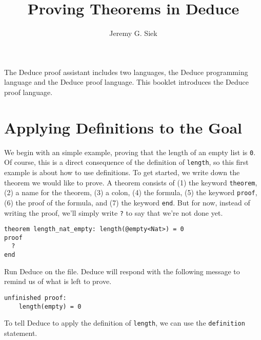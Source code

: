 \documentclass[12pt]{article}
\title{Proving Theorems in Deduce}
\author{Jeremy G. Siek}
\newif\ifBorder
\begin{document}

\Bordertrue

\maketitle

{\footnotesize
\tableofcontents
}
\pagebreak



The Deduce proof assistant includes two languages, the Deduce
programming language and the Deduce proof language. This booklet
introduces the Deduce proof language.

\section{Applying Definitions to the Goal}

We begin with an simple example, proving that the length of an empty
list is \texttt{0}. Of course, this is a direct consequence of the
definition of \texttt{length}, so this first example is about how to
use definitions.  To get started, we write down the theorem we would
like to prove.  A theorem consists of (1) the keyword
\texttt{theorem}, (2) a name for the theorem, (3) a colon, (4) the
formula, (5) the keyword \texttt{proof}, (6) the proof of the formula,
and (7) the keyword \texttt{end}. But for now, instead of writing the
proof, we'll simply write \texttt{?} to say that we're not done yet.

\begin{verbatim}
theorem length_nat_empty: length(@empty<Nat>) = 0
proof
  ?
end
\end{verbatim}

\noindent Run Deduce on the file. Deduce will respond with the following message
to remind us of what is left to prove.

\begin{verbatim}
unfinished proof:
    length(empty) = 0
\end{verbatim}

To tell Deduce to apply the definition of \texttt{length}, we can use
the \texttt{definition} statement.
\end{document}

